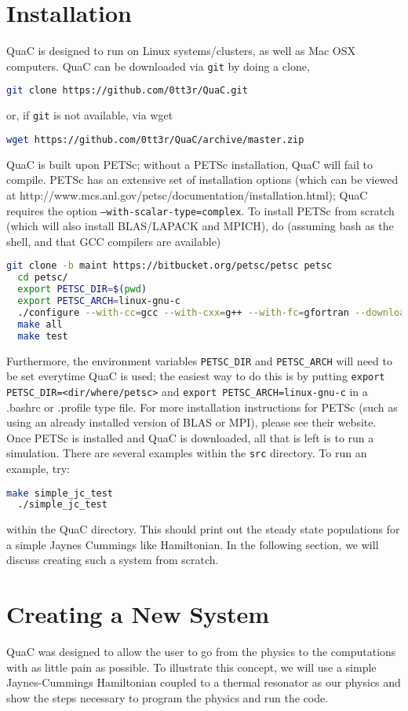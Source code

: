 \documentclass{article}
\begin{document}
\section{Installation}
QuaC is designed to run on Linux systems/clusters, as well as Mac OSX computers.
QuaC can be downloaded via \texttt{git} by doing a clone,
\begin{lstlisting}[language=bash]
  git clone https://github.com/0tt3r/QuaC.git
\end{lstlisting}
or, if \texttt{git} is not available, via wget
\begin{lstlisting}[language=bash]
  wget https://github.com/0tt3r/QuaC/archive/master.zip
\end{lstlisting}
QuaC is built upon PETSc; without a PETSc installation, QuaC will fail to compile.
PETSc has an extensive set of installation options (which can be viewed at
http://www.mcs.anl.gov/petsc/documentation/installation.html); QuaC requires the
option \texttt{--with-scalar-type=complex}. To install PETSc from scratch (which
will also install BLAS/LAPACK and MPICH), do (assuming bash as the shell, and that
GCC compilers are available)
\begin{lstlisting}[language=bash]
  git clone -b maint https://bitbucket.org/petsc/petsc petsc
  cd petsc/
  export PETSC_DIR=$(pwd)
  export PETSC_ARCH=linux-gnu-c
  ./configure --with-cc=gcc --with-cxx=g++ --with-fc=gfortran --download-fblaslapack --download-mpich --with-scalar-type=complex
  make all
  make test
\end{lstlisting}
Furthermore, the environment variables \texttt{PETSC\_DIR} and \texttt{PETSC\_ARCH} will
need to be set everytime QuaC is used; the easiest way to do this is by putting
\texttt{export PETSC\_DIR=<dir/where/petsc>} and \texttt{export PETSC\_ARCH=linux-gnu-c}
in a .bashrc or .profile type file. For more installation instructions for PETSc
(such as using an already installed version of BLAS or MPI), please
see their website.
Once PETSc is installed and QuaC is downloaded, all that is left is to run a simulation.
There are several examples within the \texttt{src} directory. To run an example, try:
\begin{lstlisting}[language=bash]
  make simple_jc_test
  ./simple_jc_test
\end{lstlisting}
within the QuaC directory. This should print out the steady state populations
for a simple Jaynes Cummings like Hamiltonian. In the following section,
we will discuss creating such a system from scratch.

\section{Creating a New System}
QuaC was designed to allow the user to go from the physics to the computations with
as little pain as possible. To illustrate this concept, we will use a simple
Jaynes-Cummings Hamiltonian coupled to a thermal resonator
as our physics and show the steps necessary to
program the physics and run the code.
\end{document}
